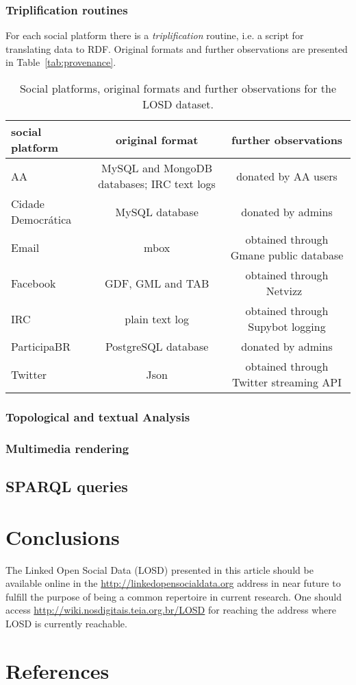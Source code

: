 \documentclass[review]{elsarticle}
\begin{document}
\subsubsection{Triplification routines}
For each social platform there is a \emph{triplification} routine,
i.e. a script for translating data to RDF.
Original formats and further observations are presented in
Table~\ref{tab:provenance}.
\begin{table*}[h!]\scriptsize
\begin{center}
\caption{Social platforms, original formats and further observations for
the LOSD dataset.}
\begin{tabular}{| l || c | c |}\hline
    \textbf{social platform} & \textbf{original format} & \textbf{further observations} \\\hline\hline
    AA & MySQL and MongoDB databases; IRC text logs & donated by AA users \\\hline
    Cidade Democrática & MySQL database & donated by admins \\\hline
    Email & mbox & obtained through Gmane public database \\\hline
    Facebook & GDF, GML and TAB & obtained through Netvizz~\cite{netvizz} \\\hline
    IRC & plain text log & obtained through Supybot logging \\\hline
    ParticipaBR & PostgreSQL database & donated by admins \\\hline
    Twitter & Json & obtained through Twitter streaming API \\\hline
\end{tabular}\end{center}
\end{table*}                    
\subsubsection{Topological and textual Analysis}
\subsubsection{Multimedia rendering}
\subsection{SPARQL queries}\label{queries}

\section{Conclusions}
\label{conclusions}
The Linked Open Social Data (LOSD) presented in this article
should be available online in the \url{http://linkedopensocialdata.org}
address in near future to fulfill the purpose of being a common
repertoire in current research.
One should access \url{http://wiki.nosdigitais.teia.org.br/LOSD}
for reaching the address where LOSD is currently reachable.

\section*{References}
%

%
%
\end{document}
